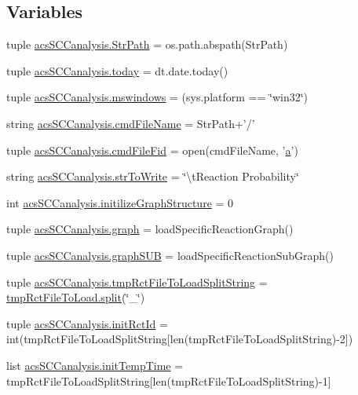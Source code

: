 \subsection*{Variables}
\begin{DoxyCompactItemize}
\item 
tuple \hyperlink{a00096_af8add8b37a9c8a7825c0e8f0e7dfd6c1}{acs\-S\-C\-Canalysis.\-Str\-Path} = os.\-path.\-abspath(Str\-Path)
\item 
tuple \hyperlink{a00096_a5498b0a6851ae4d3b2c3035093564e47}{acs\-S\-C\-Canalysis.\-today} = dt.\-date.\-today()
\item 
tuple \hyperlink{a00096_a2abf09620dd1dd990036c67c626b3dee}{acs\-S\-C\-Canalysis.\-mswindows} = (sys.\-platform == \char`\"{}win32\char`\"{})
\item 
string \hyperlink{a00096_a32551f85ad3cd8080b8ad81828276368}{acs\-S\-C\-Canalysis.\-cmd\-File\-Name} = Str\-Path+'/'
\item 
tuple \hyperlink{a00096_a0a501feb02e67bd6a8ba75490709cf89}{acs\-S\-C\-Canalysis.\-cmd\-File\-Fid} = open(cmd\-File\-Name, '\hyperlink{a00029_a2ffdbad9ea59541e59cbd2b938e0770c}{a}')
\item 
string \hyperlink{a00096_a1966f0657c6b477eeb60bde732a201cc}{acs\-S\-C\-Canalysis.\-str\-To\-Write} = \char`\"{}\textbackslash{}t\-Reaction Probability\char`\"{}
\item 
int \hyperlink{a00096_ac6ad18bfc83e8ea3254897d46f990855}{acs\-S\-C\-Canalysis.\-initilize\-Graph\-Structure} = 0
\item 
tuple \hyperlink{a00096_ab45392da38059bf7557c22cbc73e5580}{acs\-S\-C\-Canalysis.\-graph} = load\-Specific\-Reaction\-Graph()
\item 
tuple \hyperlink{a00096_ae307841da4a073fad4f6eaa172b0b970}{acs\-S\-C\-Canalysis.\-graph\-S\-U\-B} = load\-Specific\-Reaction\-Sub\-Graph()
\item 
tuple \hyperlink{a00096_add910e17b3f1fe61cdbaf8ce60ec0e20}{acs\-S\-C\-Canalysis.\-tmp\-Rct\-File\-To\-Load\-Split\-String} = \hyperlink{a00070_a4d1aa74fac80ae0275c056575fdb6626}{tmp\-Rct\-File\-To\-Load.\-split}(\char`\"{}\-\_\-\char`\"{})
\item 
tuple \hyperlink{a00096_a212643643fc6b002e8797f16633bb16d}{acs\-S\-C\-Canalysis.\-init\-Rct\-Id} = int(tmp\-Rct\-File\-To\-Load\-Split\-String\mbox{[}len(tmp\-Rct\-File\-To\-Load\-Split\-String)-\/2\mbox{]})
\item 
list \hyperlink{a00096_adc4403c4cfe080918c8b9da692c50509}{acs\-S\-C\-Canalysis.\-init\-Temp\-Time} = tmp\-Rct\-File\-To\-Load\-Split\-String\mbox{[}len(tmp\-Rct\-File\-To\-Load\-Split\-String)-\/1\mbox{]}

\end{DoxyCompactItemize}
